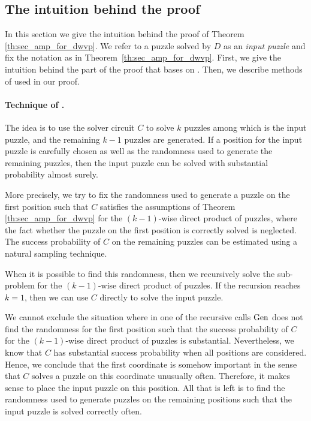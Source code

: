 %
\subsection{The intuition behind the proof}
\label{section:intuition}
In this section we give the intuition behind the proof of Theorem \ref{th:sec_amp_for_dwvp}.
We refer to a puzzle solved by $D$ as an \textit{input puzzle} and fix the notation as in Theorem~\ref{th:sec_amp_for_dwvp}.
First, we give the intuition behind the part of the proof that bases on \cite{canetti2005hardness, holenstein2011general}.
Then, we describe methods of \cite{dodis2009security} used in our proof.

\paragraph{Technique of \cite{canetti2005hardness, holenstein2011general}.}
The idea is to use the solver circuit $C$ to solve $k$ puzzles among which is the input puzzle, and
the remaining $k\!-\!1$ puzzles are generated.
If a position for the input puzzle is carefully chosen as well as the randomness used to generate the remaining puzzles,
then the input puzzle can be solved with substantial probability almost surely.

More precisely, we try to fix the randomness used to generate a puzzle on the first position such that $C$
satisfies the assumptions of Theorem \ref{th:sec_amp_for_dwvp}
for the $(k\!-\!1)$-wise direct product of puzzles, where the fact whether the puzzle on the first position is correctly solved is neglected.
The success probability of $C$ on the remaining puzzles can be estimated using a natural sampling technique.

When it is possible to find this randomness, then we recursively solve the sub-problem for the $(k\!-\!1)$-wise direct product of puzzles.
If the recursion reaches $k=1$, then we can use $C$ directly to solve the input puzzle.

We cannot exclude the situation where in one of the recursive calls $\operatorname{\text{Gen}}$ does not
find the randomness for the first position such that the success probability of $C$ for the $(k\!-\!1)$-wise direct product of puzzles is substantial.
Nevertheless, we know that $C$ has substantial success probability when all positions are considered.
Hence, we conclude that the first coordinate is somehow important in the sense that $C$ solves a puzzle on this coordinate unusually often.
Therefore, it makes sense to place the input puzzle on this position.
All that is left is to find the randomness used to generate puzzles on the remaining positions
such that the input puzzle is solved correctly often.

